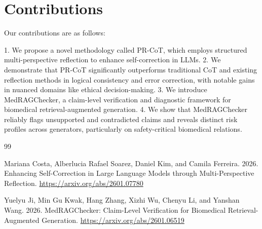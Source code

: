 \documentclass{article}
\begin{document}
\section{Contributions}

Our contributions are as follows:

1.  We propose a novel methodology called PR-CoT, which employs structured multi-perspective reflection to enhance self-correction in LLMs.
2.  We demonstrate that PR-CoT significantly outperforms traditional CoT and existing reflection methods in logical consistency and error correction, with notable gains in nuanced domains like ethical decision-making.
3.  We introduce MedRAGChecker, a claim-level verification and diagnostic framework for biomedical retrieval-augmented generation.
4.  We show that MedRAGChecker reliably flags unsupported and contradicted claims and reveals distinct risk profiles across generators, particularly on safety-critical biomedical relations.

\begin{thebibliography}{99}

Mariana Costa, Alberlucia Rafael Soarez, Daniel Kim, and Camila Ferreira. 2026. Enhancing Self-Correction in Large Language Models through Multi-Perspective Reflection. \url{https://arxiv.org/abs/2601.07780}

Yuelyu Ji, Min Gu Kwak, Hang Zhang, Xizhi Wu, Chenyu Li, and Yanshan Wang. 2026. MedRAGChecker: Claim-Level Verification for Biomedical Retrieval-Augmented Generation. \url{https://arxiv.org/abs/2601.06519}

\end{thebibliography}
\end{document}
